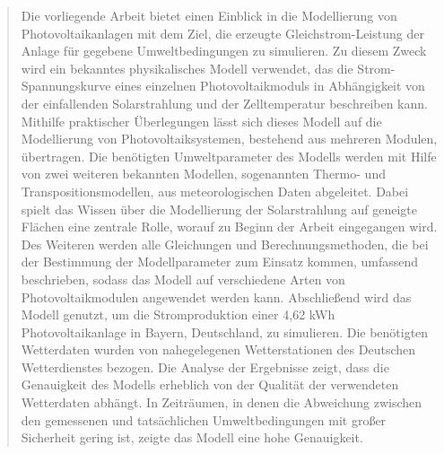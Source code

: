 


\begin{abstract}
    Die vorliegende Arbeit bietet einen Einblick in die Modellierung
    von Photovoltaikanlagen mit dem Ziel, die erzeugte Gleichstrom-Leistung der Anlage
    für gegebene Umweltbedingungen zu simulieren. Zu diesem Zweck wird ein
    bekanntes physikalisches Modell verwendet, das die Strom-Spannungskurve
    eines einzelnen Photovoltaikmoduls in Abhängigkeit von der einfallenden
    Solarstrahlung und der Zelltemperatur beschreiben kann. Mithilfe
    praktischer Überlegungen lässt sich dieses Modell auf die Modellierung
    von Photovoltaiksystemen, bestehend aus mehreren Modulen, übertragen.
    Die benötigten Umweltparameter des Modells werden mit Hilfe von zwei
    weiteren bekannten Modellen, sogenannten Thermo- und Transpositionsmodellen,
    aus meteorologischen Daten abgeleitet. Dabei spielt das Wissen über
    die Modellierung der Solarstrahlung auf geneigte Flächen eine zentrale
    Rolle, worauf zu Beginn der Arbeit eingegangen wird.
    Des Weiteren werden alle Gleichungen und Berechnungsmethoden, die bei der
    Bestimmung der Modellparameter zum Einsatz kommen, umfassend beschrieben, sodass
    das Modell auf verschiedene Arten von Photovoltaikmodulen angewendet werden
    kann. Abschließend wird das Modell genutzt, um die Stromproduktion einer
    4,62 kWh Photovoltaikanlage in Bayern, Deutschland, zu simulieren.
    Die benötigten Wetterdaten wurden von nahegelegenen Wetterstationen des
    Deutschen Wetterdienstes bezogen. Die Analyse der Ergebnisse zeigt,
    dass die Genauigkeit des Modells erheblich von der Qualität der verwendeten
    Wetterdaten abhängt. In Zeiträumen, in denen die Abweichung zwischen den
    gemessenen und tatsächlichen Umweltbedingungen mit großer Sicherheit gering ist,
    zeigte das Modell eine hohe Genauigkeit.
\end{abstract}
